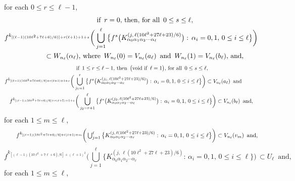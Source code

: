 \documentclass[12pt]{article}
\newcommand{\al}{\alpha}
\begin{document}
\noindent
for each $0 \le r \le \ell-1$, 
\begin{multline*}
$$
\qquad\qquad \text{if} \,\,\, r = 0, \, \text{then}, \, \text{for all} \,\,\, 0 \le s \le \ell, \\
f^{k_{[(\ell-1)(10\ell^2+7\ell+6)/6)]+r(\ell+1)+1+s}}\bigg(\bigcup_{j=1}^\ell \big\{ f^s\big(K_{\al_0\al_1\al_2\cdots\al_\ell}^{(j,\,\ell(10\ell^2+27\ell+23)/6)}\big): \, \al_i = 0, 1, \, 0 \le i \le \ell \big\}\bigg) \\
\qquad\qquad \subset W_{n_\ell}(\al_\ell), \, \text{where} \,\,\, W_{n_\ell}(0) = V_{n_\ell}(a_\ell) \,\,\, \text{and} \,\,\, W_{n_\ell}(1) = V_{n_\ell}(b_\ell), \, \text{and},
$$
\end{multline*}
\begin{multline*}
$$
\qquad\qquad \text{if} \,\,\, 1 \le r \le \ell-1, \, \text{then} \,\,\, \big(\text{void if} \,\,\, \ell = 1\big), \, \text{for all} \,\,\, 0 \le s \le \ell, \\
f^{k_{[(\ell-1)(10\ell^2+7\ell+6)/6]+r(\ell+1)+1+s}}\bigg(\bigcup_{j_1=1}^r \big\{ f^s\big(K_{\al_0\al_1\al_2\cdots\al_\ell}^{(j_1,\,\ell(10\ell^2+27\ell+23)/6)}\big): \, \al_i = 0, 1, \, 0 \le i \le \ell \big\}\bigg) \subset V_{n_\ell}(a_\ell) \,\,\, \text{and} \qquad\quad \\ 
f^{k_{[(\ell-1)(10\ell^2+7\ell+6)/6]+r(\ell+1)+1+s}}\bigg(\bigcup_{j_2=r+1}^\ell \big\{ f^s\big(K_{\al_0\al_1\al_2\cdots\al_\ell}^{(j_2,\,\ell(10\ell^2+27\ell+23)/6)}\big): \, \al_i = 0, 1, \, 0 \le i \le \ell \big\}\bigg) \subset V_{n_\ell}(b_\ell) \,\,\,\text{and},
$$
\end{multline*}
for each $1 \le m \le \ell$, 
\begin{multline*}
$$
\qquad f^{k_{[(\ell-1)(10\ell^2+7\ell+6)/6]+\ell(\ell+1)+m}}\bigg(\bigcup_{j=1}^\ell \big\{ K_{\al_0\al_1\al_2\cdots\al_\ell}^{(j, \,\ell(10\ell^2+27\ell+23)/6)}: \, \al_i = 0, 1, \, 0 \le i \le \ell \big\}\bigg) \subset V_{n_\ell}(v_m) \,\,\, \text{and},
$$
\end{multline*}
$$
f^{k_{[(\ell-1)(10\ell^2+7\ell+6)/6]+(\ell+1)^2}}\bigg(\bigcup_{j=1}^\ell \big\{ K_{\al_0\al_1\al_2\cdots\al_\ell}^{(j, \,\ell(10\ell^2+27\ell+23)/6)}: \, \al_i = 0, 1, \, 0 \le i \le \ell \big\}\bigg) \, \subset U_\ell \,\,\, \text{and}, \qquad\qquad\quad\,\,
$$
for each $1 \le m \le \ell$,  
\end{document}
